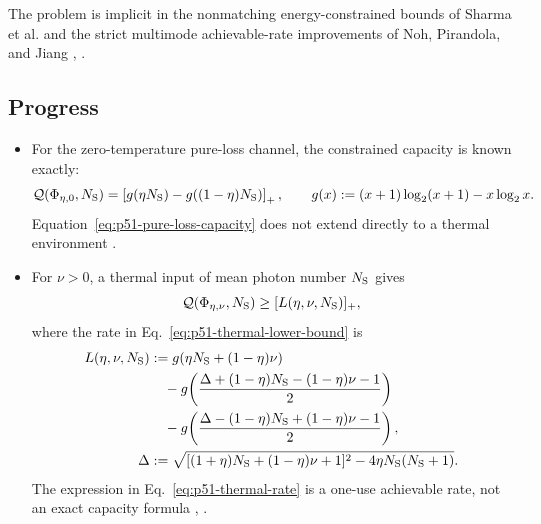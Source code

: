 The problem is implicit in the nonmatching energy-constrained bounds of
Sharma et al. and the strict multimode achievable-rate improvements of Noh,
Pirandola, and Jiang ,
.

\subsection*{Progress}

\begin{itemize}
  \item For the zero-temperature pure-loss channel, the constrained capacity
  is known exactly:
  \begin{equation}
    \mathcal Q(\Phi_{\eta,0},N_{\rm S})
    =\left[g(\eta N_{\rm S})-g((1-\eta)N_{\rm S})\right]_+,
    \qquad
    g(x):=(x+1)\log_2(x+1)-x\log_2x.
    \label{eq:p51-pure-loss-capacity}
  \end{equation}
  Equation~\eqref{eq:p51-pure-loss-capacity} does not extend directly to a
  thermal environment .

  \item For $\nu>0$, a thermal input of mean photon number $N_{\rm S}$ gives
  \begin{equation}
    \mathcal Q(\Phi_{\eta,\nu},N_{\rm S})
    \geq[L(\eta,\nu,N_{\rm S})]_+,
    \label{eq:p51-thermal-lower-bound}
  \end{equation}
  where the rate in Eq.~\eqref{eq:p51-thermal-lower-bound} is
  \begin{equation}
    \begin{aligned}
    L(\eta,\nu,N_{\rm S})
      &:={}
      g(\eta N_{\rm S}+(1-\eta)\nu)\\
      &\quad-g\!\left(
        \frac{\Delta+(1-\eta)N_{\rm S}-(1-\eta)\nu-1}{2}
      \right)\\
      &\quad-g\!\left(
        \frac{\Delta-(1-\eta)N_{\rm S}+(1-\eta)\nu-1}{2}
      \right),\\
    \Delta
      &:=\sqrt{[(1+\eta)N_{\rm S}+(1-\eta)\nu+1]^2
                -4\eta N_{\rm S}(N_{\rm S}+1)}.
    \end{aligned}
    \label{eq:p51-thermal-rate}
  \end{equation}
  The expression in Eq.~\eqref{eq:p51-thermal-rate} is a one-use achievable
  rate, not an exact capacity formula
  ,
  .


\end{itemize}
